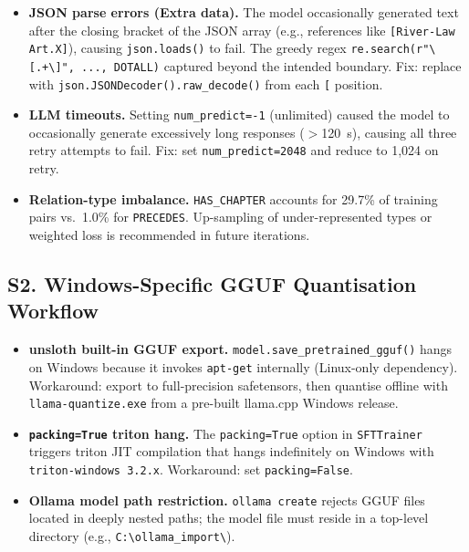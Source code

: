 \documentclass[twocolumn]{article}
\begin{document}
\begin{itemize}
  \item \textbf{JSON parse errors (Extra data).}
        The model occasionally generated text after the closing bracket of the JSON array
        (e.g., references like \texttt{[River-Law Art.X]}), causing \texttt{json.loads()} to fail.
        The greedy regex \texttt{re.search(r"\textbackslash[.+\textbackslash]", ..., DOTALL)}
        captured beyond the intended boundary.
        Fix: replace with \texttt{json.JSONDecoder().raw\_decode()} from each \texttt{[} position.
  \item \textbf{LLM timeouts.}
        Setting \texttt{num\_predict=-1} (unlimited) caused the model to occasionally
        generate excessively long responses ($>$120~s), causing all three retry attempts to fail.
        Fix: set \texttt{num\_predict=2048} and reduce to 1,024 on retry.
  \item \textbf{Relation-type imbalance.}
        \texttt{HAS\_CHAPTER} accounts for 29.7\% of training pairs vs.\ 1.0\% for
        \texttt{PRECEDES}.
        Up-sampling of under-represented types or weighted loss is recommended
        in future iterations.
\end{itemize}

\subsection*{S2. Windows-Specific GGUF Quantisation Workflow}

\begin{itemize}
  \item \textbf{unsloth built-in GGUF export.}
        \texttt{model.save\_pretrained\_gguf()} hangs on Windows because it invokes
        \texttt{apt-get} internally (Linux-only dependency).
        Workaround: export to full-precision safetensors, then quantise offline with
        \texttt{llama-quantize.exe} from a pre-built llama.cpp Windows release.
  \item \textbf{\texttt{packing=True} triton hang.}
        The \texttt{packing=True} option in \texttt{SFTTrainer} triggers triton JIT compilation
        that hangs indefinitely on Windows with \texttt{triton-windows 3.2.x}.
        Workaround: set \texttt{packing=False}.
  \item \textbf{Ollama model path restriction.}
        \texttt{ollama create} rejects GGUF files located in deeply nested paths;
        the model file must reside in a top-level directory (e.g., \texttt{C:\textbackslash{}ollama\_import\textbackslash{}}).
\end{itemize}
\end{document}
